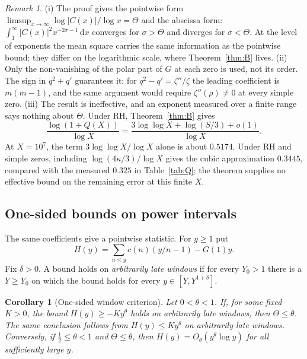 \documentclass[11pt]{amsart}
\newtheorem{corollary}[lemma]{Corollary}
\theoremstyle{remark}
\newtheorem{remark}[lemma]{Remark}
\theoremstyle{definition}
\newcommand{\dd}{\,\mathrm{d}}
\begin{document}
\begin{remark}\label{rem:A}
(i) The proof gives the pointwise form $\limsup_{x\to\infty}\log|C(x)|/\log x=\Theta$ and the abscissa form: $\int_1^\infty|C(x)|^2x^{-2\sigma-1}\dd x$ converges for $\sigma>\Theta$ and diverges for $\sigma<\Theta$. At the level of exponents the mean square carries the same information as the pointwise bound; they differ on the logarithmic scale, where Theorem~\ref{thm:B} lives.
(ii) Only the non-vanishing of the polar part of $G$ at each zero is used, not its order. The sign in $q^2+q'$ guarantees it: for $q^2-q'=\zeta''/\zeta$ the leading coefficient is $m(m-1)$, and the same argument would require $\zeta''(\rho)\ne0$ at every simple zero.
(iii) The result is ineffective, and an exponent measured over a finite range says nothing about $\Theta$. Under RH, Theorem~\ref{thm:B} gives
\[
\frac{\log(1+Q(X))}{\log X}
=\frac{3\log\log X+\log(S/3)+o(1)}{\log X}.
\]
At $X=10^7$, the term $3\log\log X/\log X$ alone is about $0.5174$. Under RH and simple zeros, including $\log(4\kappa/3)/\log X$ gives the cubic approximation $0.3445$, compared with the measured $0.325$ in Table~\ref{tab:Q}; the theorem supplies no effective bound on the remaining error at this finite $X$.
\end{remark}

\subsection{One-sided bounds on power intervals}\label{sec:windows}
The same coefficients give a pointwise statistic. For $y\ge1$ put
\[
 H(y)=\sum_{n\le y}c(n)(y/n-1)-G(1)y .
\]
Fix $\delta>0$. A bound holds on \emph{arbitrarily late windows} if for every
$Y_0>1$ there is a $Y\ge Y_0$ on which the bound holds for every
$y\in[Y,Y^{1+\delta}]$.

\begin{corollary}[One-sided window criterion]\label{cor:windows}
Let $0<\theta<1$. If, for some fixed $K>0$, the bound $H(y)\ge-Ky^\theta$
holds on arbitrarily late windows, then $\Theta\le\theta$.
The same conclusion follows from $H(y)\le Ky^\theta$ on arbitrarily late windows.
Conversely, if $\tfrac12\le\theta<1$ and $\Theta\le\theta$, then
$H(y)=O_\theta(y^\theta\log y)$ for all sufficiently large $y$.
\end{corollary}
\end{document}
